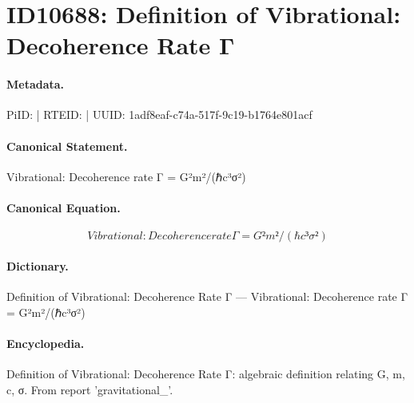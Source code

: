 \section*{ID10688: Definition of Vibrational: Decoherence Rate Γ}
\paragraph{Metadata.}
PiID:  | RTEID:  | UUID: 1adf8eaf-c74a-517f-9c19-b1764e801acf

\paragraph{Canonical Statement.}
Vibrational: Decoherence rate Γ = G²m²/(ℏc³σ²)

\paragraph{Canonical Equation.}
\[
Vibrational: Decoherence rate Γ = G²m²/(ℏc³σ²)
\]

\paragraph{Dictionary.}
Definition of Vibrational: Decoherence Rate Γ — Vibrational: Decoherence rate Γ = G²m²/(ℏc³σ²)

\paragraph{Encyclopedia.}
Definition of Vibrational: Decoherence Rate Γ: algebraic definition relating G, m, c, σ. From report 'gravitational\_'.

